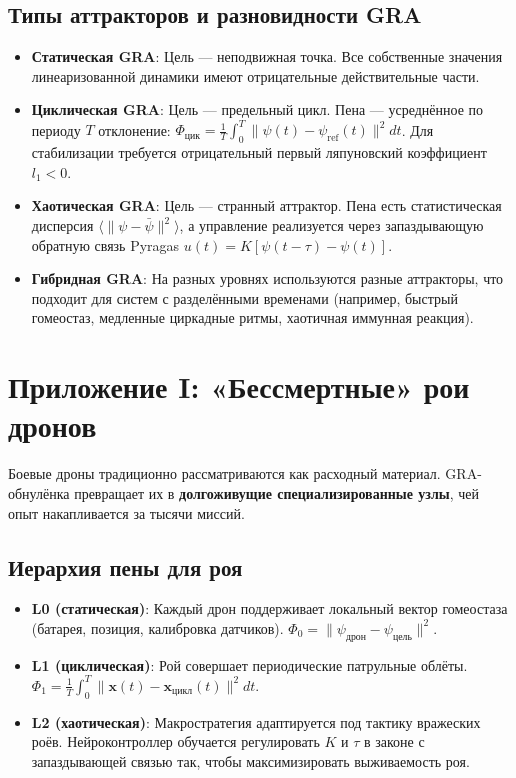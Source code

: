 \documentclass[12pt,a4paper]{article}
\begin{document}
\subsection{Типы аттракторов и разновидности GRA}
\begin{itemize}
\item \textbf{Статическая GRA}: Цель — неподвижная точка. Все собственные значения линеаризованной динамики имеют отрицательные действительные части.
\item \textbf{Циклическая GRA}: Цель — предельный цикл. Пена — усреднённое по периоду $T$ отклонение:
$\Phi_{\text{цик}} = \frac{1}{T}\int_0^T \|\psi(t) - \psi_{\text{ref}}(t)\|^2 dt$.
Для стабилизации требуется отрицательный первый ляпуновский коэффициент $l_1<0$.
\item \textbf{Хаотическая GRA}: Цель — странный аттрактор. Пена есть статистическая дисперсия $\langle \| \psi - \bar{\psi} \|^2 \rangle$,
а управление реализуется через запаздывающую обратную связь Pyragas $u(t)=K[\psi(t-\tau)-\psi(t)]$.
\item \textbf{Гибридная GRA}: На разных уровнях используются разные аттракторы, что подходит для систем с разделёнными временами (например, быстрый гомеостаз, медленные циркадные ритмы, хаотичная иммунная реакция).
\end{itemize}

\section{Приложение I: «Бессмертные» рои дронов}
\label{sec:swarm}

Боевые дроны традиционно рассматриваются как расходный материал.
GRA-обнулёнка превращает их в \textbf{долгоживущие специализированные узлы}, чей опыт накапливается за тысячи миссий.

\subsection{Иерархия пены для роя}
\begin{itemize}
\item \textbf{L0 (статическая)}: Каждый дрон поддерживает локальный вектор гомеостаза (батарея, позиция, калибровка датчиков).
$\Phi_0 = \|\psi_{\text{дрон}} - \psi_{\text{цель}}\|^2$.
\item \textbf{L1 (циклическая)}: Рой совершает периодические патрульные облёты.
$\Phi_1 = \frac{1}{T}\int_0^T \|\mathbf{x}(t) - \mathbf{x}_{\text{цикл}}(t)\|^2 dt$.
\item \textbf{L2 (хаотическая)}: Макростратегия адаптируется под тактику вражеских роёв.
Нейроконтроллер обучается регулировать $K$ и $\tau$ в законе с запаздывающей связью так, чтобы максимизировать выживаемость роя.
\end{itemize}
\end{document}
